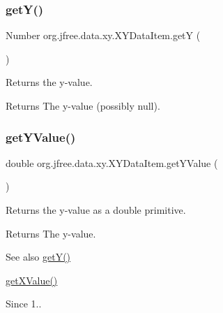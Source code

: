 \subsubsection{\texorpdfstring{get\+Y()}{getY()}}
{\footnotesize\ttfamily Number org.\+jfree.\+data.\+xy.\+X\+Y\+Data\+Item.\+getY (\begin{DoxyParamCaption}{ }\end{DoxyParamCaption})}

Returns the y-\/value.

\begin{DoxyReturn}{Returns}
The y-\/value (possibly {\ttfamily null}). 
\end{DoxyReturn}
\mbox{\label{classorg_1_1jfree_1_1data_1_1xy_1_1_x_y_data_item_a0aa8d9e18739e51a4401f673eedd91c6}} 
\subsubsection{\texorpdfstring{get\+Y\+Value()}{getYValue()}}
{\footnotesize\ttfamily double org.\+jfree.\+data.\+xy.\+X\+Y\+Data\+Item.\+get\+Y\+Value (\begin{DoxyParamCaption}{ }\end{DoxyParamCaption})}

Returns the y-\/value as a double primitive.

\begin{DoxyReturn}{Returns}
The y-\/value.
\end{DoxyReturn}
\begin{DoxySeeAlso}{See also}
\mbox{\hyperlink{classorg_1_1jfree_1_1data_1_1xy_1_1_x_y_data_item_a7b2d50b0cf1b16b806854e2fb74c25d9}{get\+Y()}} 

\mbox{\hyperlink{classorg_1_1jfree_1_1data_1_1xy_1_1_x_y_data_item_ae6fd536f9d38c38fbb2867c22820895b}{get\+X\+Value()}}
\end{DoxySeeAlso}
\begin{DoxySince}{Since}
1.. 
\end{DoxySince}
\mbox{\label{classorg_1_1jfree_1_1data_1_1xy_1_1_x_y_data_item_ac4eaf13348be48069be4b2f3e3c31fef}} 
